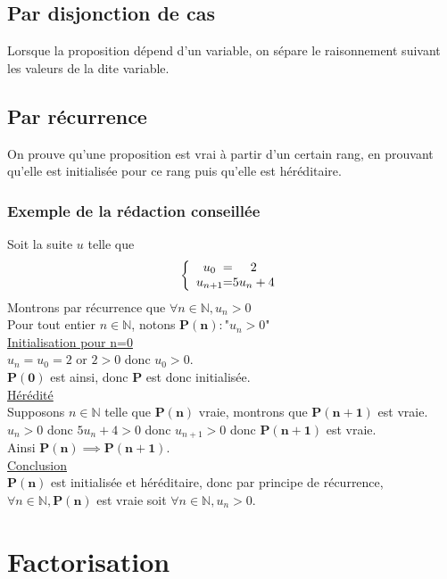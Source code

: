 \documentclass{article}
\begin{document}
\subsection{Par disjonction de cas}
Lorsque la proposition dépend d'un variable, on sépare le raisonnement suivant les valeurs de la dite variable.

\subsection{Par récurrence}
On prouve qu'une proposition est vrai à partir d'un certain rang, en prouvant qu'elle est initialisée pour ce rang puis qu'elle est héréditaire.\\
\subsubsection{Exemple de la rédaction conseillée}
Soit la suite $u$ telle que \[
\left \{
\begin{array}{c @{=} c}
	u_0     & 2      \\
	u_{n+1} & 5u_n+4 
\end{array}
\right.
\]
Montrons par récurrence que $\forall n\in\mathbb{N}, u_n>0$\\
Pour tout entier $n\in\mathbb{N}$, notons $\mathbf{P(n)}: \text{"}u_n>0\text{"}$\\
\break
\underline{Initialisation pour n=0}\\
$u_n=u_0=2$ or $2>0$ donc $u_0>0$.\\
$\mathbf{P(0)}$ est ainsi, donc $\mathbf{P}$ est donc initialisée.\\
\break
\underline{Hérédité}\\
Supposons $n\in\mathbb{N}$ telle que $\mathbf{P(n)}$ vraie, montrons que $\mathbf{P(n+1)}$ est vraie.\\
$u_n>0$ donc $5u_n+4>0$ donc $u_{n+1}>0$ donc $\mathbf{P(n+1)}$ est vraie.\\
Ainsi $\mathbf{P(n)} \implies \mathbf{P(n+1)}$.\\
\break
\underline{Conclusion}\\
$\mathbf{P(n)}$ est initialisée et héréditaire, donc par principe de récurrence, $\forall n\in\mathbb{N}, \mathbf{P(n)}$ est vraie soit $\forall n\in\mathbb{N}, u_n>0$.

\section{Factorisation}
\end{document}
